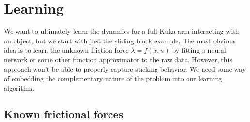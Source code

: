 \documentclass{article}
\begin{document}
\section{Learning}
We want to ultimately learn the dynamics for a full Kuka arm interacting with an object, but we start with just the sliding block example. The most obvious idea is to learn the unknown friction force $\lambda = f(\dot x, u)$ by fitting a neural network or some other function approximator to the raw data. However, this approach won't be able to properly capture sticking behavior. We need some way of embedding the complementary nature of the problem into our learning algorithm. 

\subsection{Known frictional forces}
\end{document}
